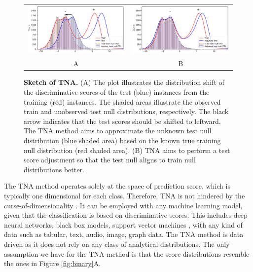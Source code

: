 \documentclass{article}
\begin{document}
\begin{figure}
	\centering
	\begin{tabular}{cc}
		\includegraphics[width=0.45\linewidth]{TNA_sketch_before.pdf}&
		\includegraphics[width=0.45\linewidth]{TNA_sketch_after.pdf} \\
		A & B  \\
	\end{tabular}
	\caption{{\bf Sketch of TNA. } (A) The plot illustrates the distribution shift of the discriminative scores of the test (blue) instances from the training (red) instances. The shaded areas illustrate the observed train and unobserved test null distributions, respectively. The black arrow indicates that the test scores should be shifted to leftward. The TNA method aims to approximate the unknown test null distribution (blue shaded area) based on the known true training null distribution (red shaded area). (B) TNA aims to perform a test score adjustment so that the test null aligns to train null distributions better. }
	\label{fig:tna_sketch}
\end{figure}


The TNA method operates solely at the space of prediction score, which is typically one dimensional for each class. Therefore, TNA is not hindered by the curse-of-dimensionality \cite{donoho2000high}. It can be employed with any machine learning model, given that the classification is based on discriminative scores. This includes deep neural networks, black box models, support vector machines \cite{cristianini2000introduction}, with any kind of data such as tabular, text, audio, image, graph data. The TNA method is data driven as it does not rely on any class of analytical distributions. The only assumption we have for the TNA method is that the score distributions resemble the ones in Figure \ref{fig:binary}A.

\end{document}
